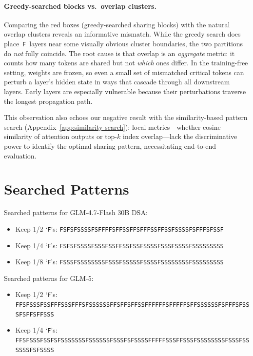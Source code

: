 \paragraph{Greedy-searched blocks vs.\ overlap clusters.}
Comparing the red boxes (greedy-searched sharing blocks) with the natural overlap clusters reveals an informative mismatch.
While the greedy search does place~\texttt{F}~layers near some visually obvious cluster boundaries, the two partitions do \emph{not} fully coincide.
The root cause is that overlap is an \emph{aggregate} metric: it counts how many tokens are shared but not \emph{which} ones differ.
In the training-free setting, weights are frozen, so even a small set of mismatched critical tokens can perturb a layer's hidden state in ways that cascade through all downstream layers.
Early layers are especially vulnerable because their perturbations traverse the longest propagation path.

This observation also echoes our negative result with the similarity-based pattern search (Appendix~\ref{app:similarity-search}): local metrics---whether cosine similarity of attention outputs or top-$k$ index overlap---lack the discriminative power to identify the optimal sharing pattern, necessitating end-to-end evaluation.

\section{Searched Patterns}
\label{app:pattern}
Searched patterns for GLM-4.7-Flash 30B DSA:
\begin{itemize}[leftmargin=*,itemsep=2pt]
    \item Keep 1/2 `\texttt{F}'s: \texttt{FSFSFSSSSFSFFFFSFFSSFFSFFFSSFFSSFSSSSFSFFFSFSSF}
    \item Keep 1/4 `\texttt{F}'s: \texttt{FSFSFSSSSFSSSFSSFFSSFSSFSSSSFSSSFSSSSFSSSSSSSSS}
    \item Keep 1/8 `\texttt{F}'s: 
    \texttt{FSSSFSSSSSSSSFSSSFSSSSSFSSSSFSSSSSSSSFSSSSSSSSS}
\end{itemize}
Searched patterns for GLM-5:
\begin{itemize}[leftmargin=*,itemsep=2pt]
    \item Keep 1/2 `\texttt{F}'s: \texttt{FFSFSSSFSSFFFSSSFFFSFSSSSSSFFSFFSFFSSFFFFFFSFFFFFSFFSSSSSSFSFFFS\allowbreak FSSSFSFFSFFSSS}
    \item Keep 1/4 `\texttt{F}'s: \texttt{FFSFSSSFSSFSFSSSSSSSFSSSSSSFSSSFSFSSSSFFFFFSSSFFSSSFSSSSSSSSFSSS\allowbreak FSSSSSSFSFSSSS}
\end{itemize}

